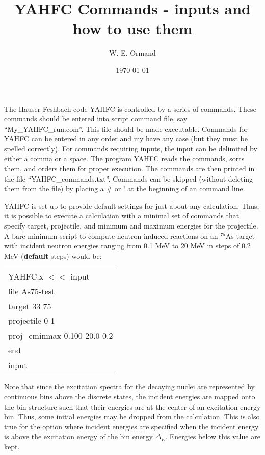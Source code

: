 \documentclass[
10pt,
showpacs,preprintnumbers,nofootinbib,
amsmath,amssymb,
aps,prc,groupedaddress,superscriptaddress,
notitlepage,showkeys
]{revtex4-1}
\begin{document}
\title{YAHFC Commands - inputs and how to use them}

\author{W. E. Ormand}

\date{\today}


\maketitle

The Hauser-Feshbach code YAHFC is controlled by a series of commands. These commands should be entered into script command file, say ``My\_YAHFC\_run.com''. This file should be made executable. Commands for YAHFC can be entered in any order and my have any case (but they must be spelled correctly). For commands requiring inputs, the input can be delimited by either a comma or a space. The program YAHFC reads the commands, sorts them, and orders them for proper execution.  The commands are then printed in the file ``YAHFC\_commands.txt''. Commands can be skipped (without deleting them from the file) by placing a \# or ! at the beginning of an command line.

YAHFC is set up to provide default settings for just about any calculation. Thus, it is possible to execute a calculation with a minimal set of commands that specify target, projectile, and minimum and maximum energies for the projectile. A bare minimum script to compute neutron-induced reactions on an $^{75}$As target with incident neutron energies ranging from 0.1 MeV to 20 MeV in steps of 0.2 MeV ({\bf default} steps) would be:
\begin{center}
\begin{tabular}{| p{10 cm}|}
\hline
YAHFC.x $<<$ input\\
 file As75-test\\
target 33 75 \\
projectile 0 1\\
proj\_eminmax   0.100   20.0  0.2\\
end\\
input\\
\hline
\end{tabular}
\end{center}
Note that since the excitation spectra for the decaying nuclei are represented by continuous bins above the discrete states, the incident energies are mapped onto the bin structure such that their energies are at the center of an excitation energy bin. Thus, some initial energies may be dropped from the calculation. This is also true for the option where incident energies are specified when the incident energy is above the excitation energy of the bin energy $\Delta_E$. Energies below this value are kept.
\end{document}
